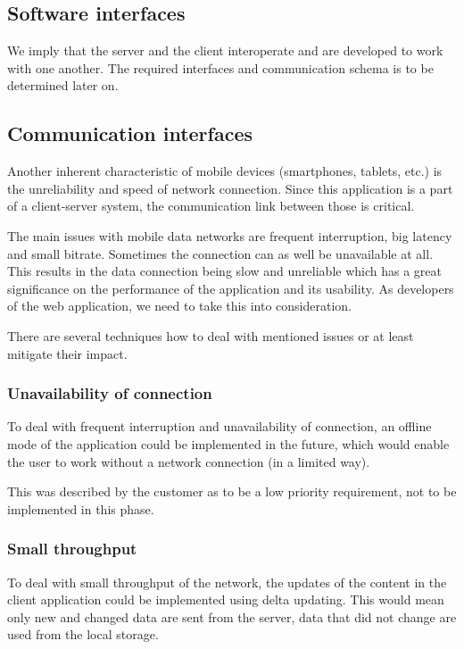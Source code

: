 \documentclass[11pt]{book}
\begin{document}
\subsection{Software interfaces}
We imply that the server and the client interoperate and are developed to work with one another. The required interfaces and communication schema is to be determined later on.

\subsection{Communication interfaces}
Another inherent characteristic of mobile devices (smartphones, tablets, etc.) is the unreliability and speed of network connection. Since this application is a part of a client-server system, the communication link between those is critical.

The main issues with mobile data networks are frequent interruption, big latency and small bitrate. Sometimes the connection can as well be unavailable at all. This results in the data connection being slow and unreliable which has a great significance on the performance of the application and its usability. As developers of the web application, we need to take this into consideration.

There are several techniques how to deal with mentioned issues or at least mitigate their impact.

\subsubsection{Unavailability of connection}\label{section:unavailabilityofconnection}
To deal with frequent interruption and unavailability of connection, an offline mode of the application could be implemented in the future, which would enable the user to work without a network connection (in a limited way).

This was described by the customer as to be a low priority requirement, not to be implemented in this phase.

\subsubsection{Small throughput}
To deal with small throughput of the network, the updates of the content in the client application could be implemented using delta updating. This would mean only new and changed data are sent from the server, data that did not change are used from the local storage.
\end{document}
